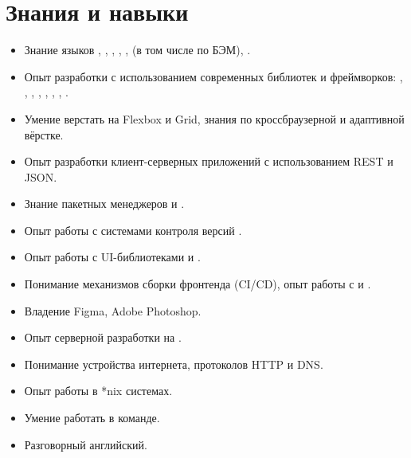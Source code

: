 \section*{Знания и навыки}

\begin{itemize}
    \item Знание языков , , , , ,  (в том числе по БЭМ), .
    \item Опыт разработки с использованием современных библиотек и фреймворков: , , , , , , , .
    \item Умение верстать на Flexbox и Grid, знания по кроссбраузерной и адаптивной вёрстке.
    \item Опыт разработки клиент-серверных приложений с использованием REST и JSON.
    \item Знание пакетных менеджеров  и .
    \item Опыт работы с системами контроля версий .
    \item Опыт работы с UI-библиотеками  и .
    \item Понимание механизмов сборки фронтенда (CI/CD), опыт работы с  и .
    \item Владение Figma, Adobe Photoshop.
    \item Опыт серверной разработки на .
    \item Понимание устройства интернета, протоколов HTTP и DNS.
    \item Опыт работы в *nix системах.
    \item Умение работать в команде.
    \item Разговорный английский.
\end{itemize}